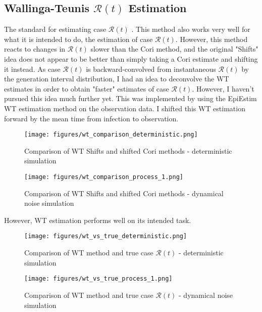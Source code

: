 \documentclass{article}
\newcommand{\nR}{\mathscr{R}}
\begin{document}
\subsection{Wallinga-Teunis $\nR(t)$ Estimation}
The standard for estimating case $\nR(t)$ \cite{WallingaTeunis}. This method also works very well for what it is intended to do, the estimation of case $\nR(t)$. However, this method reacts to changes in $\nR(t)$ slower than the Cori method, and the original "Shifts" idea does not appear to be better than simply taking a Cori estimate and shifting it instead. As case $\nR(t)$  is backward-convolved from instantaneous $\nR(t)$ by the generation interval distribution, I had an idea to deconvolve the WT estimates in order to obtain "faster" estimates of case $\nR(t)$. However, I haven't pursued this idea much further yet. This was implemented by using the EpiEstim WT estimation method on the observation data. I shifted this WT estimation forward by the mean time from infection to observation.

\begin{figure}[h!]
    \centering
    \texttt{[image: figures/wt\_comparison\_deterministic.png]}
    \caption{Comparison of WT Shifts and shifted Cori methods - deterministic simulation}
    \label{fig:my_label}
\end{figure}

\begin{figure}[h!]
    \centering
    \texttt{[image: figures/wt\_comparison\_process\_1.png]}
    \caption{Comparison of WT Shifts and shifted Cori methods - dynamical noise simulation}
    \label{fig:my_label}
\end{figure}

\clearpage
However, WT estimation performs well on its intended task.

\begin{figure}[h!]
    \centering
    \texttt{[image: figures/wt\_vs\_true\_deterministic.png]}
    \caption{Comparison of WT method and true case $\nR(t)$ - deterministic simulation}
    \label{fig:my_label}
\end{figure}

\begin{figure}[h!]
    \centering
    \texttt{[image: figures/wt\_vs\_true\_process\_1.png]}
    \caption{Comparison of WT method and true case $\nR(t)$ - dynamical noise simulation}
    \label{fig:my_label}
\end{figure}
\end{document}
